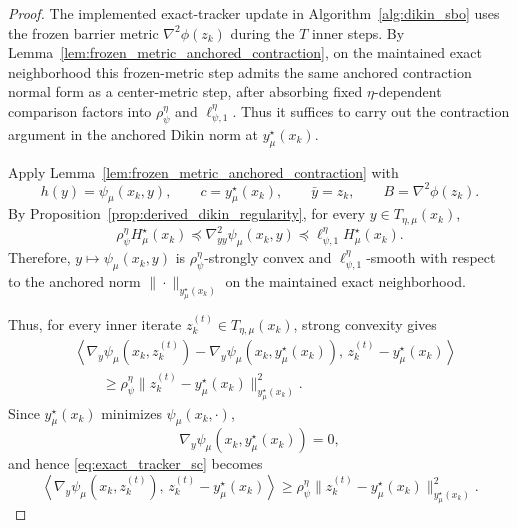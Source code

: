 \documentclass{article}
\begin{document}
\begin{proof}
The implemented exact-tracker update in Algorithm~\ref{alg:dikin_sbo} uses the frozen barrier
metric \(\nabla^2\phi(z_k)\) during the \(T\) inner steps. By
Lemma~\ref{lem:frozen_metric_anchored_contraction}, on the maintained exact neighborhood this
frozen-metric step admits the same anchored contraction normal form as a center-metric step, after
absorbing fixed \(\eta\)-dependent comparison factors into
\(\rho_\psi^\eta\) and \(\ell_{\psi,1}^\eta\). Thus it suffices to carry out the contraction argument in
the anchored Dikin norm at \(y_\mu^\star(x_k)\).

Apply Lemma~\ref{lem:frozen_metric_anchored_contraction} with
\[
h(y)=\psi_\mu(x_k,y),
\qquad
c=y_\mu^\star(x_k),
\qquad
\bar y=z_k,
\qquad
B=\nabla^2\phi(z_k).
\]
By Proposition~\ref{prop:derived_dikin_regularity}, for every
\(y\in T_{\eta,\mu}(x_k)\),
\begin{equation}
\label{eq:exact_tracker_curvature}
\rho_\psi^\eta H_\mu^\star(x_k)
\preceq
\nabla_{yy}^2\psi_\mu(x_k,y)
\preceq
\ell_{\psi,1}^\eta H_\mu^\star(x_k).
\end{equation}
Therefore, \(y\mapsto \psi_\mu(x_k,y)\) is \(\rho_\psi^\eta\)-strongly convex and
\(\ell_{\psi,1}^\eta\)-smooth with respect to the anchored norm
\(\|\cdot\|_{y_\mu^\star(x_k)}\) on the maintained exact neighborhood.

Thus, for every inner iterate \(z_k^{(t)}\in T_{\eta,\mu}(x_k)\), strong convexity gives
\begin{align}
&\left\langle
\nabla_y\psi_\mu(x_k,z_k^{(t)})
-
\nabla_y\psi_\mu(x_k,y_\mu^\star(x_k)),
\,z_k^{(t)}-y_\mu^\star(x_k)
\right\rangle
\nonumber\\
&\qquad\ge
\rho_\psi^\eta
\|z_k^{(t)}-y_\mu^\star(x_k)\|_{y_\mu^\star(x_k)}^2 .
\label{eq:exact_tracker_sc}
\end{align}
Since \(y_\mu^\star(x_k)\) minimizes \(\psi_\mu(x_k,\cdot)\),
\[
\nabla_y\psi_\mu(x_k,y_\mu^\star(x_k))=0,
\]
and hence \eqref{eq:exact_tracker_sc} becomes
\begin{equation}
\label{eq:exact_tracker_sc_simplified}
\left\langle
\nabla_y\psi_\mu(x_k,z_k^{(t)}),
\,z_k^{(t)}-y_\mu^\star(x_k)
\right\rangle
\ge
\rho_\psi^\eta
\|z_k^{(t)}-y_\mu^\star(x_k)\|_{y_\mu^\star(x_k)}^2 .
\end{equation}


\end{proof}
\end{document}
